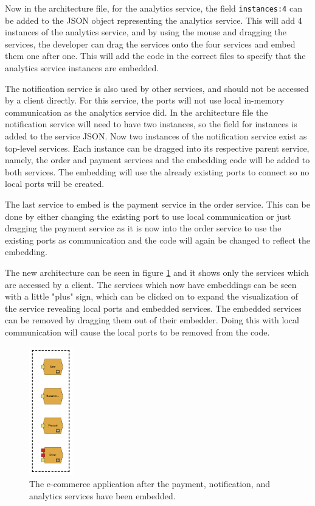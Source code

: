 Now in the architecture file, for the analytics service, the field \texttt{instances:4} can be added to the JSON object representing the analytics service. This will add 4 instances of the analytics service, and by using the mouse and dragging the services, the developer can 
drag the services onto the four services and embed them one after one. This will add the code in the correct files to specify that the analytics service instances are embedded.

The notification service is also used by other services, and should not be accessed by a client directly. For this service, the ports will not use local in-memory communication as the analytics service did.
In the architecture file the notification service will need to have two instances, so the field for instances is added to the service JSON. Now two instances of the notification service exist as top-level services. Each instance can be dragged into its respective
parent service, namely, the order and payment services and the embedding code will be added to both services. The embedding will use the already existing ports to connect so no local ports will be created.

The last service to embed is the payment service in the order service. This can be done by either changing the existing port to use local communication or just dragging the payment service
as it is now into the order service to use the existing ports as communication and the code will again be changed to reflect the embedding.

The new architecture can be seen in figure \ref*{figure:jv_embedded} and it shows only the services which are accessed by a client. The services which now have embeddings can be seen with a little "plus" sign, which can be clicked on to expand the visualization of the service revealing local ports and embedded services.
The embedded services can be removed by dragging them out of their embedder. Doing this with local communication will cause the local ports to be removed from the code.

\begin{figure}[h!]
    \center
    \includegraphics[width=0.17\textwidth]{figures/jv_embedded.png}
    \caption{The e-commerce application after the payment, notification, and analytics services have been embedded.}
    \label{figure:jv_embedded}
\end{figure}

